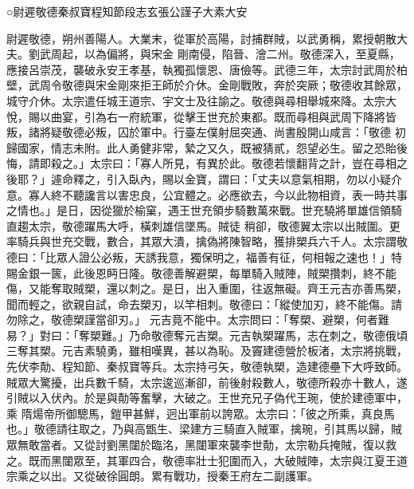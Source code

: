 
\begin{pinyinscope}

 ○尉遲敬德秦叔寶程知節段志玄張公謹子大素大安



 尉遲敬德，朔州善陽人。大業末，從軍於高陽，討捕群賊，以武勇稱，累授朝散大夫。劉武周起，以為偏將，與宋金
 剛南侵，陷晉、澮二州。敬德深入，至夏縣，應接呂崇茂，襲破永安王孝基，執獨孤懷恩、唐儉等。武德三年，太宗討武周於柏壁，武周令敬德與宋金剛來拒王師於介休。金剛戰敗，奔於突厥；敬德收其餘眾，城守介休。太宗遣任城王道宗、宇文士及往諭之。敬德與尋相舉城來降。太宗大悅，賜以曲宴，引為右一府統軍，從擊王世充於東都。既而尋相與武周下降將皆叛，諸將疑敬德必叛，囚於軍中。行臺左僕射屈突通、尚書殷開山咸言：「敬德
 初歸國家，情志未附。此人勇健非常，縶之又久，既被猜貳，怨望必生。留之恐貽後悔，請即殺之。」太宗曰：「寡人所見，有異於此。敬德若懷翻背之計，豈在尋相之後耶？」遽命釋之，引入臥內，賜以金寶，謂曰：「丈夫以意氣相期，勿以小疑介意。寡人終不聽讒言以害忠良，公宜體之。必應欲去，今以此物相資，表一時共事之情也。」是日，因從獵於榆窠，遇王世充領步騎數萬來戰。世充驍將單雄信領騎直趨太宗，敬德躍馬大呼，橫刺雄信墜馬。賊徒
 稍卻，敬德翼太宗以出賊圍。更率騎兵與世充交戰，數合，其眾大潰，擒偽將陳智略，獲排槊兵六千人。太宗謂敬德曰：「比眾人證公必叛，天誘我意，獨保明之，福善有征，何相報之速也！」特賜金銀一篋，此後恩眄日隆。敬德善解避槊，每單騎入賊陣，賊槊攢刺，終不能傷，又能奪取賊槊，還以刺之。是日，出入重圍，往返無礙。齊王元吉亦善馬槊，聞而輕之，欲親自試，命去槊刃，以竿相刺。敬德曰：「縱使加刃，終不能傷。請勿除之，敬德槊謹當卻刃。」
 元吉竟不能中。太宗問曰：「奪槊、避槊，何者難易？」對曰：「奪槊難。」乃命敬德奪元吉槊。元吉執槊躍馬，志在刺之，敬德俄頃三奪其槊。元吉素驍勇，雖相嘆異，甚以為恥。及竇建德營於板渚，太宗將挑戰，先伏李勣、程知節、秦叔寶等兵。太宗持弓矢，敬德執槊，造建德壘下大呼致師。賊眾大驚擾，出兵數千騎，太宗逡巡漸卻，前後射殺數人，敬德所殺亦十數人，遂引賊以入伏內。於是與勣等奮擊，大破之。王世充兄子偽代王琬，使於建德軍中，乘
 隋煬帝所御驄馬，鎧甲甚鮮，迥出軍前以誇眾。太宗曰：「彼之所乘，真良馬也。」敬德請往取之，乃與高甑生、梁建方三騎直入賊軍，擒琬，引其馬以歸，賊眾無敢當者。又從討劉黑闥於臨洺，黑闥軍來襲李世勣，太宗勒兵掩賊，復以救之。既而黑闥眾至，其軍四合，敬德率壯士犯圍而入，大破賊陣，太宗與江夏王道宗乘之以出。又從破徐圓朗。累有戰功，授秦王府左二副護軍。




\end{pinyinscope}
